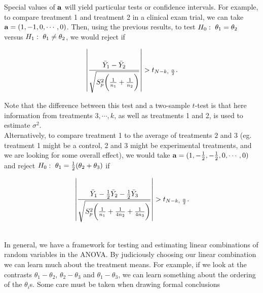 \documentclass{homework}
\begin{document}
\begin{tcolorbox}[title=Example of ANOVA contrasts]

Special values of ${\bf a}$ will yield particular tests or confidence intervals. For example, to compare treatment 1 and treatment 2 in a clinical exam trial, we can take ${\bf a} = (1, -1, 0, \cdots, 0)$. Then, using the previous results, to test $H_0: \textnormal{ } \theta_1=\theta_2$ versus $H_1: \textnormal{ } \theta_1 \neq \theta_2$, we would reject if 

$$
\left|{\frac{\bar{Y}_1 - \bar{Y}_2}{{\sqrt{S_p^2 \bigg(\frac{1}{n_1}+\frac{1}{n_2}\bigg)}}}}\right| > t_{N-k, \textnormal{ } \frac{\alpha}{2}}.
$$

Note that the difference between this test and a two-sample $t$-test is that here information from treatments $3,\cdots,k$, as well as treatments 1 and 2, is used to estimate $\sigma^2$. \\

Alternatively, to compare treatment 1 to the average of treatments $2$ and 3 (eg. treatment 1 might be a control, 2 and 3 might be experimental treatments, and we are looking for some overall effect), we would take ${\bf a} = (1, -\frac{1}{2}, -\frac{1}{2}, 0, \cdots, 0)$ and reject $H_0: \textnormal{ } \theta_1 = \frac{1}{2}(\theta_2+\theta_3)$ if 

$$
\left|{\frac{\bar{Y}_1 - \frac{1}{2} \bar{Y}_2 - \frac{1}{2} \bar{Y}_3}{{\sqrt{S_p^2 \bigg(\frac{1}{n_1}+\frac{1}{4n_2}+\frac{1}{4n_3}\bigg)}}}}\right| > t_{N-k, \textnormal{ } \frac{\alpha}{2}}.
$$

\blank \\

In general, we have a framework for testing and estimating linear combinations of random variables in the ANOVA. By judiciously choosing our linear combination we can learn much about the treatment means. For example, if we look at the contrasts $\theta_1-\theta_2$, $\theta_2-\theta_3$ and $\theta_1-\theta_3$, we can learn something about the ordering of the $\theta_i$s. Some care must be taken when drawing formal conclusions 
\end{tcolorbox}

\blank \\
\end{document}
